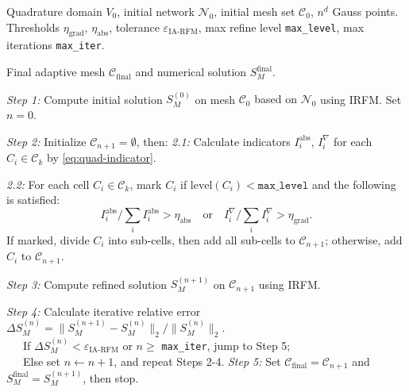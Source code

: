 \documentclass{article}
\theoremstyle{plain}
\theoremstyle{definition}
\begin{document}
\begin{algorithm}[H]
\caption{The Iterative Adaptive Random Feature Method (IA-RFM)}
\label{alg: IA}
\begin{algorithmic}[1]
\REQUIRE Quadrature domain $V_0$,  {initial network $\mathcal{N}_0$}, initial mesh  {set} $\mathcal{C}_0$, $n^d$ Gauss points. Thresholds  $\eta_{\text{grad}}$, $\eta_{\text{abs}}$, tolerance $\varepsilon_{\text{IA-RFM}}$, max refine level {\tt max\_{level}}, max iterations {\tt max\_iter}.

\ENSURE Final adaptive mesh  $\mathcal{C}_{\text{final}}$  and numerical solution $S_{M}^{\text{final}}$.

\STATE \emph{Step 1: } Compute initial solution $S_{M}^{(0)}$ on mesh $\mathcal{C}_0$  {based on $\mathcal{N}_0$} using IRFM. Set $n=0$.

\STATE \emph{Step 2: } Initialize $\mathcal{C}_{n+1} = \emptyset$, then:
    \STATE \quad \emph{2.1:} Calculate indicators $I_{i}^{\text{abs}}$, $I_{i}^{\nabla}$ for each $C_i \in \mathcal{C}_k$ by \eqref{eq:quad-indicator}.

    \STATE \quad \emph{2.2:} For each cell $C_i \in \mathcal{C}_k$, mark $C_i$  if  {$\text{level}(C_i) < \texttt{max\_level}$} and the following is satisfied:
    \begin{equation}
        I_{i}^{\text{abs}}/\sum_i I_{i}^{\text{abs}}  > {\eta_{\text{abs}}}
        \quad \text{or}
        \quad 
        I_{i}^{\nabla}/\sum_i I_{i}^{\nabla} > \eta_{\text{grad}}.
    \end{equation}
    If marked, divide $C_i$ into sub-cells, then add all sub-cells to $\mathcal{C}_{n+1}$; otherwise, add $C_i$ to $\mathcal{C}_{n+1}$.

\STATE \emph{Step 3: } Compute refined solution $S_{M}^{(n+1)}$ on $\mathcal{C}_{n+1}$ using IRFM. 

\STATE \emph{Step 4: } Calculate iterative relative error $\Delta S_{M}^{(n)} = {\|S_{M}^{(n+1)} - S_{M}^{(n)}\|_2}/{\|S_{M}^{(n)}\|_2}$. \\
\ \ \ If $\Delta S_{M}^{(n)} < \varepsilon_{\text{IA-RFM}}$ or $n \geq$ {\tt max\_iter}, jump to Step 5;\\
\ \ \ Else set $n \leftarrow n+1$, and repeat Steps 2-4.
\STATE \emph{Step 5: } Set $\mathcal{C}_{\text{final}} = \mathcal{C}_{n+1}$ and  $S_{M}^{\text{final}} = S_{M}^{(n+1)}$, then stop.
\end{algorithmic}
\end{algorithm}
\end{document}

